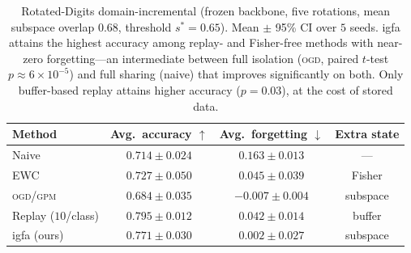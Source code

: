 \documentclass[10pt,a4paper]{article}
\theoremstyle{plain}
\theoremstyle{definition}
\newcommand{\sstar}{s^{\ast}}
\newcommand{\IGFA}{igfa}
\newcommand{\OGD}{\textsc{ogd}}
\begin{document}
\begin{table}[tb]\centering\small
\caption{Rotated-Digits domain-incremental (frozen backbone, five rotations, mean
subspace overlap $0.68$, threshold $\sstar=0.65$). Mean $\pm$ 95\% CI over $5$ seeds.
\IGFA{} attains the highest accuracy among replay- and Fisher-free methods with near-zero
forgetting---an intermediate between full isolation (\OGD, paired $t$-test
$p\approx6\times10^{-5}$) and full sharing (naive) that improves significantly on both.
Only buffer-based replay attains higher accuracy ($p=0.03$), at the cost of stored data.}
\label{tab:benchmark2}
\begin{tabular}{lccc}
\toprule
Method & Avg.\ accuracy $\uparrow$ & Avg.\ forgetting $\downarrow$ & Extra state \\
\midrule
Naive            & $0.714\pm0.024$ & $0.163\pm0.013$  & --- \\
EWC \cite{kirkpatrick2017}  & $0.727\pm0.050$ & $0.045\pm0.039$  & Fisher \\
\OGD{}/\textsc{gpm} \cite{farajtabar2020,saha2021} & $0.684\pm0.035$ & $-0.007\pm0.004$ & subspace \\
Replay ($10$/class) & $0.795\pm0.012$ & $0.042\pm0.014$ & buffer \\
\IGFA{} (ours)   & $\mathbf{0.771\pm0.030}$ & $0.002\pm0.027$ & subspace \\
\bottomrule
\end{tabular}
\end{table}
\end{document}
